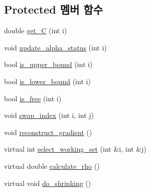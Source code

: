 \subsection*{Protected 멤버 함수}
\begin{DoxyCompactItemize}
\item 
double \hyperlink{class_solver_ae55a8581815436d13e760dadaec34e2a}{get\+\_\+\+C} (int i)
\item 
void \hyperlink{class_solver_a5a978b4ff9b60b2d75e54970fd6a2c20}{update\+\_\+alpha\+\_\+status} (int i)
\item 
bool \hyperlink{class_solver_a98d878b13d6f710fcaa0b16e657a37b6}{is\+\_\+upper\+\_\+bound} (int i)
\item 
bool \hyperlink{class_solver_a5876eedb0a6de6954f6037af0992cbed}{is\+\_\+lower\+\_\+bound} (int i)
\item 
bool \hyperlink{class_solver_a7b5e230875b8b5f06150ff0690e36b47}{is\+\_\+free} (int i)
\item 
void \hyperlink{class_solver_a043f498c1dda0122859d03f9cd07dc08}{swap\+\_\+index} (int i, int j)
\item 
void \hyperlink{class_solver_a7e34992ede606a336606ae54f6e963e6}{reconstruct\+\_\+gradient} ()
\item 
virtual int \hyperlink{class_solver_a95fb4eaf33362558e1fc768f4db019d3}{select\+\_\+working\+\_\+set} (int \&i, int \&j)
\item 
virtual double \hyperlink{class_solver_ad00b01f72232ca932cad68e58c9cde5a}{calculate\+\_\+rho} ()
\item 
virtual void \hyperlink{class_solver_ad3f6665a1ca590e56b3d51f8ddcc347c}{do\+\_\+shrinking} ()
\end{DoxyCompactItemize}
